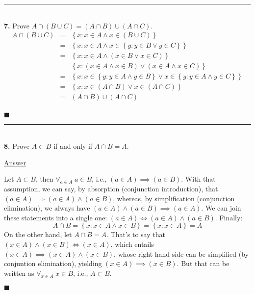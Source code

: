 \documentclass{article}[10pt]
\newenvironment{exercise}[1]
    {\noindent\rule{2cm}{0.4pt} \\
     \textbf{#1.}}
    {}
\newcommand{\answer}{

  \underline{Answer}

}
\newcommand{\qed}{

\hfill\ensuremath{\blacksquare}

}
\begin{document}
\begin{exercise}{7}
  Prove $A \cap (B \cup C) = (A \cap B) \cup (A \cap C)$.
  \[\begin{array}{rcl}
    A \cap (B \cup C)
    &=& \left\{ x : x \in A \land x \in (B \cup C) \right\} \\
    &=& \left\{ x : x \in A \land
                    x \in \left\{ y : y \in B \lor y \in C \right\}
        \right\} \\
    &=& \left\{ x : x \in A \land
                    \left( x \in B \lor x \in C \right)
        \right\} \\
    &=& \left\{ x : \left( x \in A \land x \in B \right) \lor
                    \left( x \in A \land x \in C \right)
        \right\} \\
    &=& \left\{ x : x \in \left\{ y : y \in A \land y \in B \right\}
                    \lor
                    x \in \left\{ y : y \in A \land y \in C \right\}
        \right\} \\
    &=& \left\{ x : x \in (A \cap B) \lor x \in(A \cap C) \right\} \\
    &=& (A \cap B) \cup (A \cap C) \\
  \end{array}\]
  \qed
\end{exercise}


\begin{exercise}{8}
  Prove $A \subset B$ if and only if $A \cap B = A$.
  \answer
  Let $A \subset B$, then $\forall_{a \in A} \; a \in B$,
  i.e., $(a \in A) \implies (a \in B)$.
  With that assumption, we can say,
  by absorption (conjunction introduction),
  that $(a \in A) \implies (a \in A) \land (a \in B)$,
  whereas, by simplification (conjunction elimination),
  we always have $(a \in A) \land (a \in B) \implies (a \in A)$.
  We can join these statements into a single one:
  $(a \in A) \iff (a \in A) \land (a \in B)$.
  Finally:
  \[
    A \cap B
    = \left\{ x : x \in A \land x \in B \right\}
    = \left\{ x : x \in A \right\}
    = A
  \]
  On the other hand, let $A \cap B = A$.
  That's to say that $(x \in A) \land (x \in B) \iff (x \in A)$,
  which entails $(x \in A) \implies (x \in A) \land (x \in B)$,
  whose right hand side can be simplified (by conjuntion elimination),
  yielding $(x \in A) \implies (x \in B)$.
  But that can be written as $\forall_{x \in A} \; x \in B$,
  i.e., $A \subset B$.
  \qed
\end{exercise}
\end{document}

